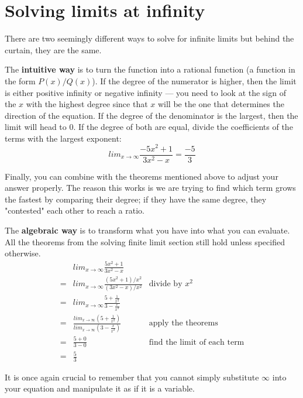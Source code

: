 \section{Solving limits at infinity}
There are two seemingly different ways to solve for infinite limits but behind the curtain, they are the same. 

The \textbf{intuitive way} is to turn the function into a rational function (a function in the form $P(x)/Q(x)$). If the degree of the numerator is higher, then the limit is either positive infinity or negative infinity — you need to look at the sign of the $x$ with the highest degree since that $x$ will be the one that determines the direction of the equation. If the degree of the denominator is the largest, then the limit will head to $0$. If the degree of both are equal, divide the coefficients of the terms with the largest exponent:
\[
    lim_{x\to\infty}\frac{-5x^2+1}{3x^2-x}
    = \frac{-5}{3}
\]

Finally, you can combine with the theorems mentioned above to adjust your answer properly. The reason this works is we are trying to find which term grows the fastest by comparing their degree; if they have the same degree, they "contested" each other to reach a ratio.

The \textbf{algebraic way} is to transform what you have into what you can evaluate. All the theorems from the solving finite limit section still hold unless specified otherwise. 
\[\begin{aligned}
    & lim_{x\to\infty}\frac{5x^2+1}{3x^2-x} \\
    =& 
        lim_{x\to\infty}\frac{(5x^2+1) / x^2}{(3x^2-x) / x^2} 
        &\text{divide by } x^2 \\
    =& lim_{x\to\infty}\frac{5+\frac{1}{x^2}}{3-\frac{x}{x^2}} \\
    =& 
        \frac
            {lim_{x\to\infty}(5+\frac{1}{x^2})}
            {lim_{x\to\infty}(3-\frac{x}{x^2})}
        &\text{apply the theorems} \\
    =& \frac{5+0}{3-0} &\text{find the limit of each term} \\
    =& \frac{5}{3}
\end{aligned}\]

It is once again crucial to remember that you cannot simply substitute $\infty$ into your equation and manipulate it as if it is a variable.

